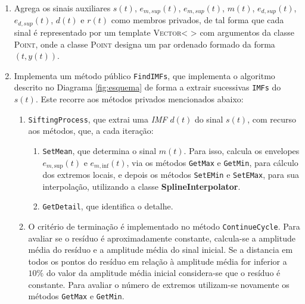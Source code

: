 \documentclass[letterpaper]{article}
\begin{document}
\begin{multicols}{2}
\begin{enumerate}
    
    \item Agrega os sinais auxiliares $s(t)$, $e_{m, sup}(t)$, $e_{m, sup}(t)$, $m(t)$, $e_{d, sup}(t)$, $e_{d, sup}(t)$, $d(t)$ e $r(t)$ como membros privados, de tal forma que cada sinal é representado por um template \textsc{Vector< >} com argumentos da classe \textsc{Point}, onde a classe \textsc{Point} designa um par ordenado formado da forma $ \left( t, y(t) \right) $.
    
    \item Implementa um método público \texttt{FindIMFs}, que implementa o algoritmo descrito no Diagrama \ref{fig:esquema} de forma a extrair sucessivas \texttt{IMFs} do $ s(t) $. Este recorre aos métodos privados mencionados abaixo:
        
        \begin{enumerate}[label = \textbf{(\arabic*)} ]
        
            \item \texttt{SiftingProcess}, que extrai uma \textit{IMF} $ d(t) $ do sinal $ s(t) $, com recurso aos métodos, que, a cada iteração:
            
            \begin{enumerate}[label = \textbf{(\arabic*)} ]
            
                \item \texttt{SetMean}, que determina o sinal $ m(t) $. Para isso, calcula os envelopes $ e_{m, \text{sup}}(t) $ e $ e_{m, \text{inf}}(t)$, via os métodos \texttt{GetMax} e \texttt{GetMin}, para cálculo dos extremos locais, e depois os métodos \texttt{SetEMin} e \texttt{SetEMax}, para sua interpolação, utilizando a classe \textbf{SplineInterpolator}.
                
                \item \texttt{GetDetail}, que identifica o detalhe.
            
            \end{enumerate}
            
            \item O critério de terminação é implementado no método \texttt{ContinueCycle}. Para avaliar se o resíduo é aproximadamente constante, calcula-se a amplitude média do resíduo e a amplitude média do sinal inicial. Se a distancia em todos os pontos do resíduo em relação à amplitude média for inferior a $10\%$ do valor da amplitude média inicial considera-se que o resíduo é constante. Para avaliar o número de extremos utilizam-se novamente os métodos \texttt{GetMax} e \texttt{GetMin}.
        

\end{enumerate}
\end{enumerate}
\end{multicols}
\end{document}
